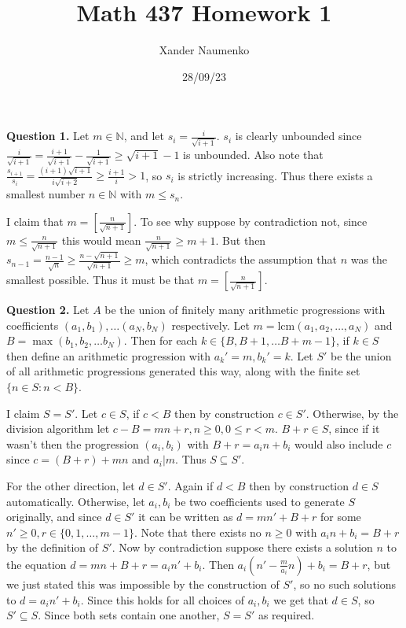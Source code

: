 \documentclass[letterpaper, reqno,11pt]{article}
\begin{document}
\title{Math 437 Homework 1}
\date{28/09/23}
\author{Xander Naumenko}
\maketitle

{\medskip\noindent\bf Question 1.} Let $m\in \mathbb{N}$, and let $s_i=\frac{i}{\sqrt{i+1}}$. $s_i$ is clearly unbounded since $\frac{i}{\sqrt{i+1}}= \frac{i+1}{\sqrt{i+1}}-\frac{1}{\sqrt{i+1}}\geq\sqrt{i+1}-1$ is unbounded. Also note that $\frac{s_{i+1}}{s_i}=\frac{(i+1)\sqrt{i+1}}{i\sqrt{i+2}}\geq \frac{i+1}{i}>1$, so $s_i$ is strictly increasing. Thus there exists a smallest number $n\in\mathbb{N}$ with $m\leq s_n$.

I claim that $m=\left[\frac{n}{\sqrt{n+1}}\right]$. To see why suppose by contradiction not, since $m\leq \frac{n}{\sqrt{n+1}}$ this would mean $\frac{n}{\sqrt{n+1}}\geq m+1$. But then $s_{n-1}=\frac{n-1}{\sqrt{n}}\geq \frac{n-\sqrt{n+1}}{\sqrt{n+1}}\geq m$, which contradicts the assumption that $n$ was the smallest possible. Thus it must be that $m=\left[\frac{n}{\sqrt{n+1}}\right]$.

\medskip

{\medskip\noindent\bf Question 2.} Let $A$ be the union of finitely many arithmetic progressions with coefficients $(a_1,b_1), \ldots (a_N,b_N)$ respectively. Let $m=\text{lcm}\left( a_1,a_2,\ldots,a_N \right) $ and $B=\max(b_1, b_2, \ldots b_N) $. Then for each $k\in \{B,B+1,\ldots B+m-1\}$, if $k\in S$ then define an arithmetic progression with $a_k'=m,b_k'=k$. Let $S'$ be the union of all arithmetic progressions generated this way, along with the finite set $\{n\in S:n<B\}$.

I claim $S=S'$. Let $c\in S$, if $c< B$ then by construction $c\in S'$. Otherwise, by the division algorithm let $c-B=mn+r, n\geq0, 0\leq r<m$. $B+r\in S$, since if it wasn't then the progression $(a_i,b_i)$ with $B+r = a_i n+b_i$ would also include $c$ since $c=(B+r)+mn$ and $a_i|m$. Thus $S\subseteq S'$.

For the other direction, let $d\in S'$. Again if $d< B$ then by construction $d\in S$ automatically. Otherwise, let $a_i,b_i$ be two coefficients used to generate $S$ originally, and since $d\in S'$ it can be written as $d=mn'+B+r$ for some $n'\geq 0,r\in \{0,1,\ldots,m-1\}$. Note that there exists no $n\geq 0$ with $a_i n+b_i=B+r$ by the definition of $S'$. Now by contradiction suppose there exists a solution $n$ to the equation $d=mn+B+r=a_i n'+b_i$. Then $a_i(n'-\frac{m}{a_i}n)+b_i=B+r$, but we just stated this was impossible by the construction of $S'$, so no such solutions to $d=a_in'+b_i$. Since this holds for all choices of $a_i,b_i$ we get that $d\in S$, so $S'\subseteq S$. Since both sets contain one another, $S=S'$ as required.
\end{document}
